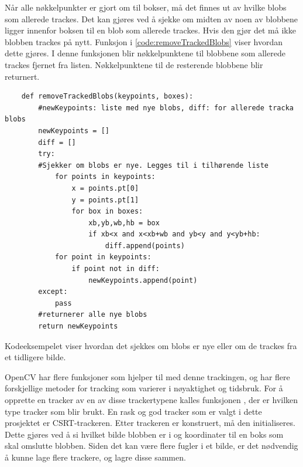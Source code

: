 Når alle nøkkelpunkter er gjort om til bokser, må det finnes ut av hvilke blobs som allerede trackes. 
Det kan gjøres ved å sjekke om midten av noen av blobbene ligger innenfor boksen til en blob som allerede trackes. 
Hvis den gjør det må ikke blobben trackes på nytt. 
Funksjon\newline {} i \autoref{code:removeTrackedBlobs} viser hvordan dette gjøres.
I denne funksjonen blir nøkkelpunktene til blobbene som allerede trackes fjernet fra listen. 
Nøkkelpunktene til de resterende blobbene blir returnert.

\begin{listing}[!htb]
\begin{verbatim}
    def removeTrackedBlobs(keypoints, boxes):
        #newKeypoints: liste med nye blobs, diff: for allerede tracka blobs
        newKeypoints = []
        diff = []
        try:
        #Sjekker om blobs er nye. Legges til i tilhørende liste
            for points in keypoints:
                x = points.pt[0]
                y = points.pt[1]
                for box in boxes:
                    xb,yb,wb,hb = box
                    if xb<x and x<xb+wb and yb<y and y<yb+hb:
                        diff.append(points)
            for point in keypoints:
                if point not in diff:
                    newKeypoints.append(point)
        except:
            pass
        #returnerer alle nye blobs
        return newKeypoints
\end{verbatim}
\caption{Kodeeksempelet viser hvordan det sjekkes om blobs er nye eller om de trackes fra et tidligere bilde.}
\label{code:removeTrackedBlobs}
\end{listing}

OpenCV har flere funksjoner som hjelper til med denne trackingen, og har flere forskjellige metoder for tracking som varierer i nøyaktighet og tidsbruk.
For å opprette en tracker av en av disse trackertypene kalles funksjonen , der  er hvilken type tracker som blir brukt. En rask og god tracker som er valgt i dette prosjektet er CSRT-trackeren. 
Etter trackeren er konstruert, må den initialiseres.
Dette gjøres ved å si hvilket bilde blobben er i og koordinater til en boks som skal omslutte blobben. 
Siden det kan være flere fugler i et bilde, er det nødvendig å kunne lage flere trackere, og lagre disse sammen.

